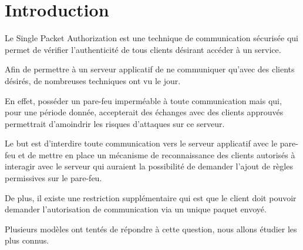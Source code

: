 \chapter*{Introduction}

Le Single Packet Authorization est une technique de communication sécurisée qui permet de vérifier l'authenticité de tous clients désirant accéder à un service.

Afin de permettre à un serveur applicatif de ne communiquer qu'avec des clients désirés, de nombreuses techniques ont vu le jour. 

En effet, posséder un pare-feu imperméable à toute communication mais qui, pour une période donnée, accepterait des échanges avec des clients approuvés permettrait d'amoindrir les risques d'attaques sur ce serveur.

Le but est d'interdire toute communication vers le serveur applicatif avec le pare-feu et de mettre en place un mécanisme de reconnaissance des clients autorisés à interagir avec le serveur qui auraient la possibilité de demander l'ajout de règles permissives sur le pare-feu.

De plus, il existe une restriction supplémentaire qui est que le client doit pouvoir demander l'autorisation de communication via un unique paquet envoyé.

Plusieurs modèles ont tentés de répondre à cette question, nous allons étudier les plus connus.
